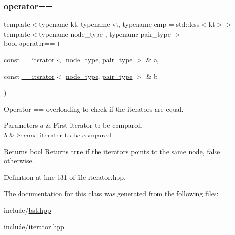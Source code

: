 \mbox{\label{classbst_1_1____iterator_a2e5014cb825532053115734598e16318}} 
\subsubsection{\texorpdfstring{operator==}{operator==}}
{\footnotesize\ttfamily template$<$typename kt, typename vt, typename cmp = std\+::less$<$kt$>$$>$ \\
template$<$typename node\+\_\+type , typename pair\+\_\+type $>$ \\
bool operator== (\begin{DoxyParamCaption}\item[{const \hyperlink{classbst_1_1____iterator}{\+\_\+\+\_\+iterator}$<$ \hyperlink{classbst_a062eb2a1ac54802dbc4f0f74ae2afd01}{node\+\_\+type}, \hyperlink{classbst_a7b11cca2a3b4394915600194f741ab16}{pair\+\_\+type} $>$ \&}]{a,  }\item[{const \hyperlink{classbst_1_1____iterator}{\+\_\+\+\_\+iterator}$<$ \hyperlink{classbst_a062eb2a1ac54802dbc4f0f74ae2afd01}{node\+\_\+type}, \hyperlink{classbst_a7b11cca2a3b4394915600194f741ab16}{pair\+\_\+type} $>$ \&}]{b }\end{DoxyParamCaption})\hspace{0.3cm}{\ttfamily [friend]}}



Operator == overloading to check if the iterators are equal. 


\begin{DoxyParams}{Parameters}
{\em a} & First iterator to be compared. \\
\hline
{\em b} & Second iterator to be compared. \\
\hline
\end{DoxyParams}
\begin{DoxyReturn}{Returns}
bool Returns true if the iterators points to the same node, false otherwise. 
\end{DoxyReturn}


Definition at line 131 of file iterator.\+hpp.



The documentation for this class was generated from the following files\+:\begin{DoxyCompactItemize}
\item 
include/\hyperlink{bst_8hpp}{bst.\+hpp}\item 
include/\hyperlink{iterator_8hpp}{iterator.\+hpp}\end{DoxyCompactItemize}
